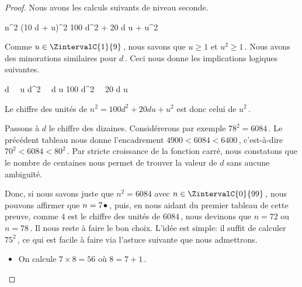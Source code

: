 \begin{proof}
    
    Nous avons les calculs suivants de niveau seconde.
    
    \medskip
    
    \begin{stepcalc}[style = sar]
    	n^2
	\explnext{}
    	(10 d + u)^2
    	100 d^2 + 20 d u + u^2
    \end{stepcalc}
    
    \medskip
    
    Comme $u \in \ZintervalC{1}{9}$\,, nous savons que 
    $u   \geq 1$ et
    $u^2 \geq 1$\,.
    Nous avons des minorations similaires pour $d$\,.
    Ceci nous donne les implications logiques suivantes.
    
    \medskip

    \begin{stepcalc}[style = ar*, ope = {\implies[donc]}]
    	d \in {}
		\,\,\,\,
    	u \in {}
	\explnext{}
    	d^2 
		\,\,\,\,
    	d u 
	\explnext{}
    	100 d^2 
		\,\,\,\,
    	20 d u 
    \end{stepcalc}
    
    \bigskip

    Le chiffre des unités de $n^2 = 100 d^2 + 20 d u + u^2$ est donc celui de $u^2$\,.
    
    \medskip

    Passons à $d$ le chiffre des dizaines. 
    Considérerons par exemple $78^2 = 6084$\,. Le précédent tableau nous donne l'encadrement $4900< 6084 < 6400$\,, c'est-à-dire $70^2 < 6084 < 80^2$\,.
    Par stricte croissance de la fonction carré, nous constatons que le nombre de centaines nous permet de trouver la valeur de $d$ sans aucune ambiguïté.
    
    \medskip

    Donc, si nous savons juste que $n^2 = 6084$ avec $n \in \ZintervalC{0}{99}$\,, nous pouvons affirmer que $n = 7\kern1pt\bullet$\,, puis, en nous aidant du premier tableau de cette preuve, comme $4$ est le chiffre des unités de $6084$\,, nous devinons que $n = 72$ ou $n = 78$\,. Il nous reste à faire le bon choix. L'idée est simple: il suffit de calculer $75^2$\,, ce qui est facile à faire via l'astuce suivante que nous admettrons.
    
    \begin{itemize}
    	\item On calcule $7 \times 8 = 56$ où $8 = 7 + 1$\,.
	

\end{itemize}
\end{proof}

